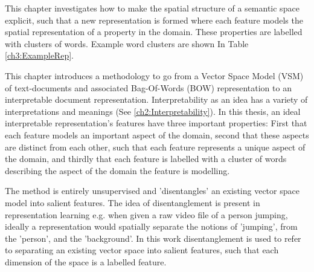 This chapter investigates how to make the spatial structure of a semantic space explicit, such that a new representation is formed where each feature models the spatial representation of a property in the domain. These properties are labelled with clusters of words. Example word clusters are shown In Table \ref{ch3:ExampleRep}. 











This chapter introduces a methodology to go from a Vector Space Model (VSM) of text-documents and associated Bag-Of-Words (BOW) representation to an interpretable document representation. Interpretability as an idea has a variety of interpretations and meanings (See \ref{ch2:Interpretability}). In this thesis, an ideal interpretable representation's features have three important properties: First that each feature models an important aspect of the domain, second that these aspects are distinct from each other, such that each feature represents a unique aspect of the domain, and thirdly that each feature is labelled with a cluster of words describing the aspect of the domain the feature is modelling. 



The method is entirely unsupervised and 'disentangles' an existing vector space model into salient features. The idea of disentanglement is present in representation learning \cite{Bengio2012} e.g. when given a raw video file of a person jumping, ideally a representation would spatially separate the notions of 'jumping', from the 'person', and the 'background'. In this work disentanglement is used to refer to separating an existing vector space into salient features, such that each dimension of the space is a labelled feature. 

